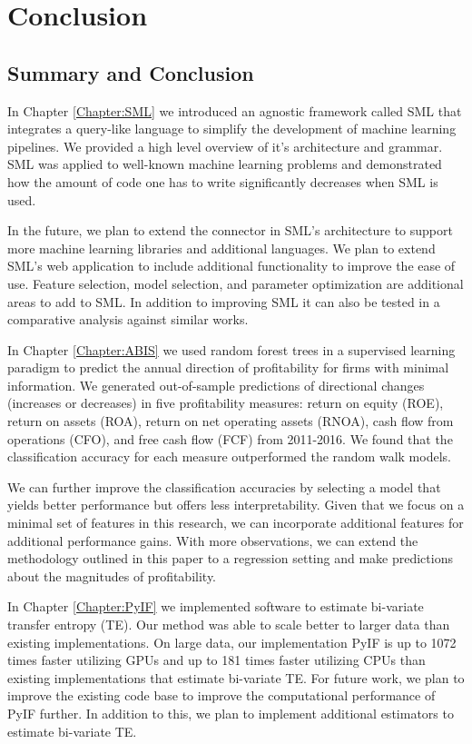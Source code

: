 \chapter{Conclusion}


\section{Summary and Conclusion}

In Chapter \ref{Chapter:SML} we introduced an agnostic framework called SML that integrates a query-like language to simplify the development of machine learning pipelines.   We provided a high level overview of it’s architecture and grammar. SML was applied to well-known machine learning problems and demonstrated how the amount of code one has to write significantly decreases when SML is used.  

In the future, we plan to extend the connector in SML's architecture to support more machine learning libraries and additional languages.  We plan to extend SML’s web application to include additional functionality to improve the ease of use.  Feature selection, model selection, and parameter optimization are additional areas to add to SML. In addition to improving SML it can also be tested in a comparative analysis against similar works.  

In Chapter \ref{Chapter:ABIS}  we used random forest trees in a supervised learning paradigm to predict the annual direction of profitability for firms with minimal information.  We generated out-of-sample predictions of directional changes (increases or decreases) in five profitability measures: return on equity (ROE), return on assets (ROA), return on net operating assets (RNOA), cash flow from operations (CFO), and free cash flow (FCF) from 2011-2016. We found that the classification accuracy for each measure outperformed the random walk models.

We can further improve the classification accuracies by selecting a model that yields better performance but offers less interpretability.  Given that we focus on a minimal set of features in this research, we can incorporate additional features for additional performance gains. With more observations, we can extend the methodology outlined in this paper to a regression setting and make predictions about the magnitudes of profitability.

In Chapter \ref{Chapter:PyIF} we implemented software to estimate bi-variate transfer entropy  (TE).  Our method was able to scale better to larger data than existing implementations.  On large data, our implementation PyIF is up to 1072 times faster utilizing GPUs and up to 181 times faster utilizing CPUs than existing implementations that estimate bi-variate TE. For future work, we plan to improve the existing code base to improve the computational performance of PyIF further.  In addition to this, we plan to implement additional estimators to estimate bi-variate TE.


